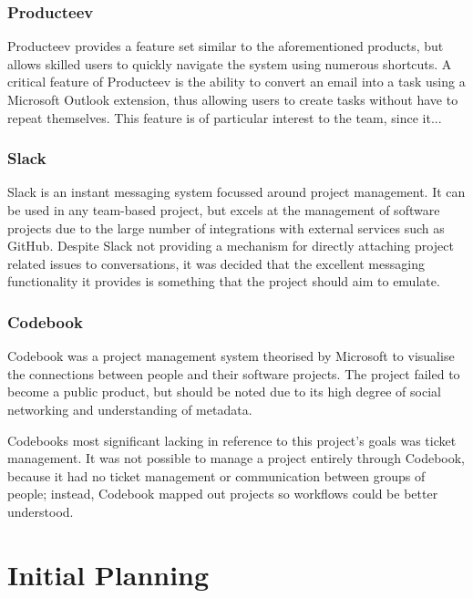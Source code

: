 \documentclass[a4paper]{l3proj}
\begin{document}
\subsection{Producteev}
\label{producteev}

Producteev provides a feature set similar to the aforementioned products, but allows skilled users to quickly navigate the system using numerous shortcuts. A critical feature of Producteev is the ability to convert an email into a task using a Microsoft Outlook extension, thus allowing users to create tasks without have to repeat themselves. This feature is of particular interest to the team, since it... 


\subsection{Slack}
\label{slack}
Slack is an instant messaging system focussed around project management. It can be used in any team-based project, but excels at the management of software projects due to the large number of integrations with external services such as GitHub. Despite Slack not providing a mechanism for directly attaching project related issues to conversations, it was decided that the excellent messaging functionality it provides is something that the project should aim to emulate.

\subsection{Codebook}
\label{codebook}
Codebook was a project management system theorised by Microsoft to visualise the connections between people and their software projects. The project failed to become a public product, but should be noted due to its high degree of social networking and understanding of metadata.

Codebooks most significant lacking in reference to this project’s goals was ticket management. It was not possible to manage a project entirely through Codebook, because it had no ticket management or communication between groups of people; instead, Codebook mapped out projects so workflows could be better understood.

\chapter{Initial Planning}
\label{initialPlanning}
\end{document}
